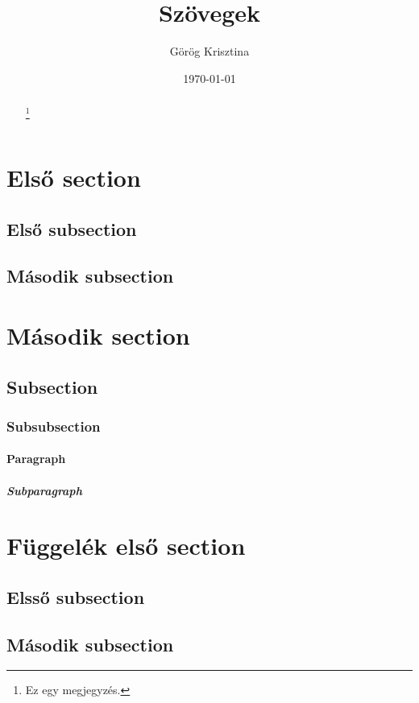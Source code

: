 \documentclass{article}
\title{Szövegek}
\author{Görög Krisztina}
\date{\today}
\begin{document}
\renewcommand{\thefootnote}{\fnsymbol{footnote}}
\maketitle

\begin{abstract}
\hulipsum[1]\footnote{Ez egy megjegyzés.}
\end{abstract}

\setcounter{tocdepth}{5}
\tableofcontents
\clearpage

\setcounter{secnumdepth}{5}

\section{Első section}
\subsection{Első subsection}
\hulipsum

\subsection{Második subsection}
\hulipsum

\section[Második]{Második section}
\subsection{Subsection}
\subsubsection{Subsubsection}
\paragraph{Paragraph}
\subparagraph{Subparagraph}

\appendix
\section{Függelék első section}
\subsection{Elsső subsection}
\quote{\hulipsum[2]}
\subsection{Második subsection}
\quotation{\hulipsum[2]}
\end{document}
